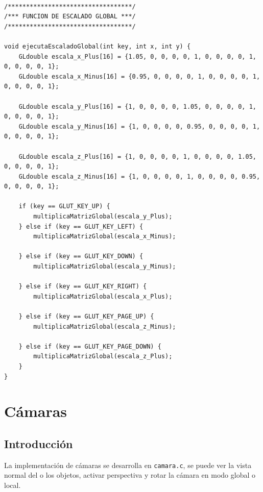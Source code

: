 \documentclass[12pt,a4paper]{article}
\begin{document}
\begin{lstlisting}

/**********************************/
/*** FUNCION DE ESCALADO GLOBAL ***/
/**********************************/

void ejecutaEscaladoGlobal(int key, int x, int y) {
    GLdouble escala_x_Plus[16] = {1.05, 0, 0, 0, 0, 1, 0, 0, 0, 0, 1, 0, 0, 0, 0, 1};
    GLdouble escala_x_Minus[16] = {0.95, 0, 0, 0, 0, 1, 0, 0, 0, 0, 1, 0, 0, 0, 0, 1};

    GLdouble escala_y_Plus[16] = {1, 0, 0, 0, 0, 1.05, 0, 0, 0, 0, 1, 0, 0, 0, 0, 1};
    GLdouble escala_y_Minus[16] = {1, 0, 0, 0, 0, 0.95, 0, 0, 0, 0, 1, 0, 0, 0, 0, 1};

    GLdouble escala_z_Plus[16] = {1, 0, 0, 0, 0, 1, 0, 0, 0, 0, 1.05, 0, 0, 0, 0, 1};
    GLdouble escala_z_Minus[16] = {1, 0, 0, 0, 0, 1, 0, 0, 0, 0, 0.95, 0, 0, 0, 0, 1};

    if (key == GLUT_KEY_UP) {
        multiplicaMatrizGlobal(escala_y_Plus);
    } else if (key == GLUT_KEY_LEFT) {
        multiplicaMatrizGlobal(escala_x_Minus);

    } else if (key == GLUT_KEY_DOWN) {
        multiplicaMatrizGlobal(escala_y_Minus);

    } else if (key == GLUT_KEY_RIGHT) {
        multiplicaMatrizGlobal(escala_x_Plus);

    } else if (key == GLUT_KEY_PAGE_UP) {
        multiplicaMatrizGlobal(escala_z_Minus);

    } else if (key == GLUT_KEY_PAGE_DOWN) {
        multiplicaMatrizGlobal(escala_z_Plus);
    }
}
\end{lstlisting}










\newpage

\section{Cámaras}

\subsection{Introducción}

La implementación de cámaras se desarrolla en \texttt{camara.c}, se puede ver la vista normal del o los objetos, activar perspectiva y rotar la cámara en modo global o local.
\end{document}
